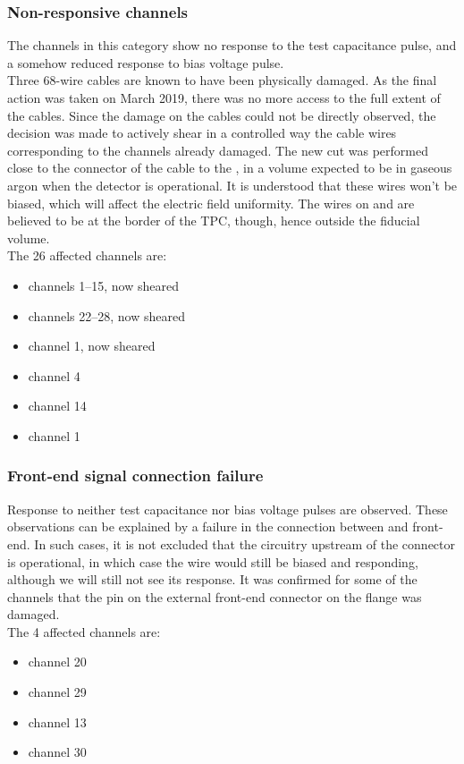 \subsubsection{Non-responsive channels}
\label{sssec:status:ShearedCables}

The channels in this category show no response to the test capacitance pulse,
and a somehow reduced response to bias voltage pulse.
\\
Three 68-wire cables are known to have been physically damaged.
As the final action was taken on March 2019, there was no more access to the
full extent of the cables. Since the damage on the cables could not be directly
observed, the decision was made to actively shear in a controlled way the cable
wires corresponding to the channels already damaged. The new cut was performed
close to the connector of the cable to the \DBB, in a volume expected to be in
gaseous argon when the detector is operational. It is understood that these
wires won't be biased, which will affect the electric field uniformity.
The wires on   and   are
believed to be at the border of the TPC, though, hence outside the fiducial
volume.
\\
The 26 affected channels are:
\begin{itemize}
  \item {}  channels  1--15, now sheared
  \item {}  channels  22--28, now sheared
  \item {}  channel   1, now sheared
  \item {}  channel   4 
  \item {}  channel  14
  \item {}  channel   1
\end{itemize}


\subsubsection{Front-end signal connection failure}
\label{sssec:NoFrontEndSignal}

Response to neither test capacitance nor bias voltage pulses are observed.
These observations can be explained by a failure in the connection between \DBB
and front-end. In such cases, it is not excluded that the circuitry upstream of
the connector is operational, in which case the wire would still be biased
and responding, although we will still not see its response.
It was confirmed for some of the channels that the pin on the external front-end
connector on the flange was damaged.
\\
The 4 affected channels are:
\begin{itemize}
  \item {}  channel 20
  \item {}  channel 29
  \item {}  channel 13
  \item {}  channel 30
\end{itemize}


